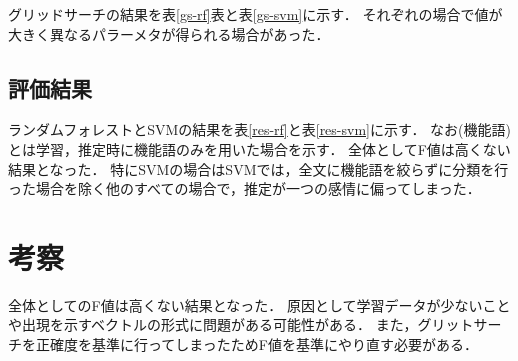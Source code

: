 グリッドサーチの結果を表\ref{gs-rf}表と表\ref{gs-svm}に示す．
それぞれの場合で値が大きく異なるパラーメタが得られる場合があった．

\subsection{評価結果}
\begin{table}[ht]
 \centering
  \caption{ランダムフォレストでの結果}
  \vspace{0.3\baselineskip}
  \label{res-rf}
\end{table}

\begin{table}[ht]
 \centering
  \caption{SVMでの結果}
  \vspace{0.3\baselineskip}
  \label{res-svm}
\end{table}

ランダムフォレストとSVMの結果を表\ref{res-rf}と表\ref{res-svm}に示す．
なお(機能語)とは学習，推定時に機能語のみを用いた場合を示す．
全体としてF値は高くない結果となった．
特にSVMの場合はSVMでは，全文に機能語を絞らずに分類を行った場合を除く他のすべての場合で，推定が一つの感情に偏ってしまった．

\section{考察}
全体としてのF値は高くない結果となった．
原因として学習データが少ないことや出現を示すベクトルの形式に問題がある可能性がある．
また，グリットサーチを正確度を基準に行ってしまったためF値を基準にやり直す必要がある．

